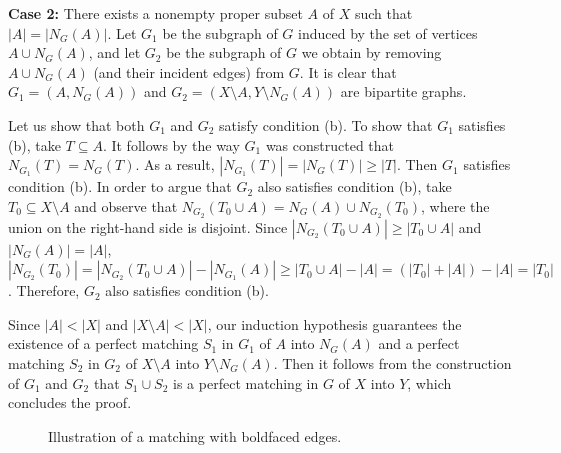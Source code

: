 \documentclass[a4paper,12pt]{report}
\begin{document}
\begin{enumerate}
			\textbf{Case 2:} There exists a nonempty proper subset $A$ of $X$ such that $|A| = |N_G(A)|$. Let $G_1$ be the subgraph of $G$ induced by the set of vertices $A \cup N_G(A)$, and let $G_2$ be the subgraph of $G$ we obtain by removing $A \cup N_G(A)$ (and their incident edges) from $G$. It is clear that $G_1 = (A, N_G(A))$ and $G_2 = (X \setminus A, Y \setminus N_G(A))$ are bipartite graphs.
			
			Let us show that both $G_1$ and $G_2$ satisfy condition (b). To show that $G_1$ satisfies (b), take $T \subseteq A$. It follows by the way $G_1$ was constructed that $N_{G_1}(T) = N_G(T)$. As a result, $|N_{G_1}(T)| = |N_G(T)| \geq |T|$. Then $G_1$ satisfies condition (b). In order to argue that $G_2$ also satisfies condition (b), take $T_0 \subseteq X \setminus A$ and observe that $N_{G_2}(T_0 \cup A) = N_G(A) \cup N_{G_2}(T_0)$, where the union on the right-hand side is disjoint. Since $|N_{G_2}(T_0 \cup A)| \geq |T_0 \cup A|$ and $|N_G(A)| = |A|$, $|N_{G_2}(T_0)| = |N_{G_2}(T_0 \cup A)| - |N_{G_1}(A)| \geq |T_0 \cup A| - |A| = (|T_0| + |A|) - |A| = |T_0|$. Therefore, $G_2$ also satisfies condition (b).
			
			Since $|A| < |X|$ and $|X \setminus A| < |X|$, our induction hypothesis guarantees the existence of a perfect matching $S_1$ in $G_1$ of $A$ into $N_G(A)$ and a perfect matching $S_2$ in $G_2$ of $X \setminus A$ into $Y \setminus N_G(A)$. Then it follows from the construction of $G_1$ and $G_2$ that $S_1 \cup S_2$ is a perfect matching in $G$ of $X$ into $Y$, which concludes the proof.
		\end{enumerate}
	 
	 \begin{figure}[ht]
	 	\centering
	 	\caption{Illustration of a matching with boldfaced edges.}
	 \end{figure}
	
\end{document}
